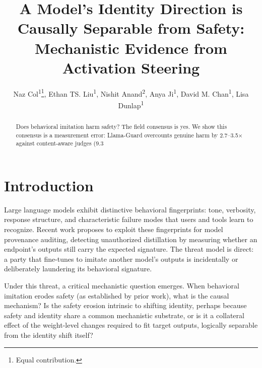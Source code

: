 \documentclass[letterpaper,twocolumn]{article}
\title{A Model's Identity Direction is Causally Separable from Safety: Mechanistic Evidence from Activation Steering}
\author{
    Naz Col\textsuperscript{1}\thanks{Equal contribution.},
    Ethan TS. Liu\textsuperscript{1}\footnotemark[1],
    Nishit Anand\textsuperscript{2}, 
    Anya Ji\textsuperscript{1},
    David M. Chan\textsuperscript{1},
    Lisa Dunlap\textsuperscript{1}
}
\begin{document}
\maketitle

\begin{abstract}
Does behavioral imitation harm safety? The field consensus is yes. We show this consensus is a measurement error: Llama-Guard overcounts genuine harm by 2.7–3.5× against content-aware judges (9.3%
\end{abstract}

\section{Introduction}

Large language models exhibit distinctive behavioral fingerprints: tone, verbosity, response structure, and characteristic failure modes that users and tools learn to recognize. Recent work proposes to exploit these fingerprints for model provenance auditing, detecting unauthorized distillation by measuring whether an endpoint's outputs still carry the expected signature. The threat model is direct: a party that fine-tunes to imitate another model's outputs is incidentally or deliberately laundering its behavioral signature.

Under this threat, a critical mechanistic question emerges. When behavioral imitation erodes safety (as established by prior work), what is the causal mechanism? Is the safety erosion intrinsic to shifting identity, perhaps because safety and identity share a common mechanistic substrate, or is it a collateral effect of the weight-level changes required to fit target outputs, logically separable from the identity shift itself?
\end{document}
